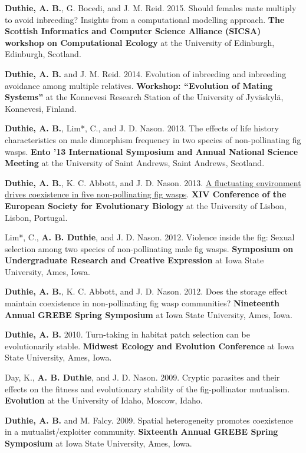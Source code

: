 \documentclass[letterpaper]{article}
\renewenvironment{itemize}{
  \begin{list}{}{
    \setlength{\leftmargin}{1.5em}
  }
}{
  \end{list}
}
\begin{document}
\begin{itemize}
\item {\bf Duthie, A. B.}, G. Bocedi, and J. M. Reid. 2015. Should females mate multiply to avoid inbreeding? Insights from a computational modelling approach. {\bf The Scottish Informatics and Computer Science Alliance (SICSA) workshop on Computational Ecology} at the University of Edinburgh, Edinburgh, Scotland.
\item {\bf Duthie, A. B.} and J. M. Reid. 2014. Evolution of inbreeding and inbreeding avoidance among multiple relatives. {\bf Workshop: ``Evolution of Mating Systems''} at the Konnevesi Research Station of the University of Jyv\"{a}skyl\"{a}, Konnevesi, Finland.
\item {\bf Duthie, A. B.}, Lim*, C., and J. D. Nason. 2013. The effects of life history characteristics on male dimorphism frequency in two species of non-pollinating fig wasps. {\bf Ento '13 International Symposium and Annual National Science Meeting} at the University of Saint Andrews, Saint Andrews, Scotland.
\item {\bf Duthie, A. B.}, K. C. Abbott, and J. D. Nason. 2013. \href{https://www.youtube.com/watch?v=8Oi48FdaLXY}{A fluctuating environment drives coexistence in five non-pollinating fig wasps}. {\bf XIV Conference of the European Society for Evolutionary Biology} at the University of Lisbon, Lisbon, Portugal.
\item Lim*, C., {\bf A. B. Duthie}, and J. D. Nason. 2012. Violence inside the fig: Sexual selection among two species of non-pollinating male fig wasps. {\bf Symposium on Undergraduate Research and Creative Expression} at Iowa State University, Ames, Iowa.
\item {\bf Duthie, A. B.}, K. C. Abbott, and J. D. Nason. 2012. Does the storage effect maintain coexistence in non-pollinating fig wasp communities? {\bf Nineteenth Annual GREBE Spring Symposium} at Iowa State University, Ames, Iowa.
\item {\bf Duthie, A. B.} 2010. Turn-taking in habitat patch selection can be evolutionarily stable. {\bf Midwest Ecology and Evolution Conference} at Iowa State University, Ames, Iowa.
\item Day, K., {\bf A. B. Duthie}, and J. D. Nason. 2009. Cryptic parasites and their effects on the fitness and evolutionary stability of the fig-pollinator mutualism. {\bf Evolution} at the University of Idaho, Moscow, Idaho.
\item {\bf Duthie, A. B.} and M. Falcy. 2009. Spatial heterogeneity promotes coexistence in a mutualist/exploiter community. {\bf Sixteenth Annual GREBE Spring Symposium} at Iowa State University, Ames, Iowa.

\end{itemize}
\end{document}

